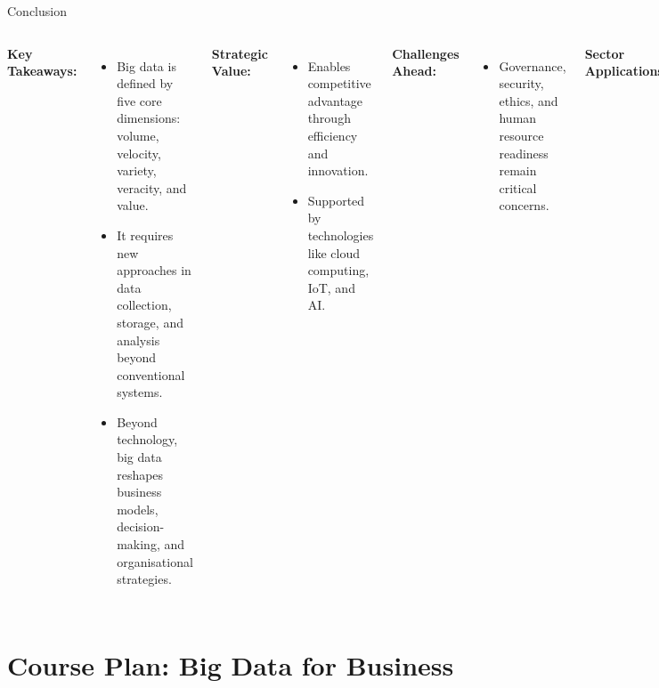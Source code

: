 \documentclass[aspectratio=169, table]{beamer}
\begin{document}
\begin{frame}[fragile]{Conclusion}
	\vspace{20pt}
	\small
	\begin{columns}[T]
		\textbf{Key Takeaways:}
		\begin{itemize}
			\item Big data is defined by five core dimensions: volume, velocity, variety, veracity, and value.
			\item It requires new approaches in data collection, storage, and analysis beyond conventional systems.
			\item Beyond technology, big data reshapes business models, decision-making, and organisational strategies.
		\end{itemize}
		
		\textbf{Strategic Value:}
		\begin{itemize}
			\item Enables competitive advantage through efficiency and innovation.
			\item Supported by technologies like cloud computing, IoT, and AI.
		\end{itemize}
		
		\textbf{Challenges Ahead:}
		\begin{itemize}
			\item Governance, security, ethics, and human resource readiness remain critical concerns.
		\end{itemize}
		
		\textbf{Sector Applications:}
		\begin{itemize}
			\item Value creation depends on alignment between technology, business strategy, and data culture.
		\end{itemize}
		
		\textbf{Next Sessions:}  
		Will explore data lifecycle management, infrastructure selection, and practical analytics across industries.
	\end{columns}
\end{frame}

\section{Course Plan: Big Data for Business}
\end{document}
